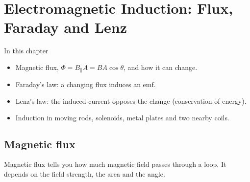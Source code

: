 \chapter{Electromagnetic Induction: Flux, Faraday and Lenz}\label{ch3:chap}
\newcommand\chThreeACW[3]{%
  \draw[line width=1.2pt, hscink] ($(#1,#2)+(110:#3)$) arc (110:400:#3);
  \draw[line width=1.2pt, hscink, -{Latex[length=2.4mm, width=2.0mm]}]
    ($(#1,#2)+(40:#3)+(310:0.05)$) -- ($(#1,#2)+(40:#3)+(130:0.19)$);}
\newcommand\chThreeCW[3]{%
  \draw[line width=1.2pt, hscink] ($(#1,#2)+(70:#3)$) arc (70:-220:#3);
  \draw[line width=1.2pt, hscink, -{Latex[length=2.4mm, width=2.0mm]}]
    ($(#1,#2)+(140:#3)+(230:0.05)$) -- ($(#1,#2)+(140:#3)+(50:0.19)$);}

\begin{summarybox}{In this chapter}
\begin{itemize}
  \item Magnetic flux, $\Phi = B_\parallel A = BA\cos\theta$, and how it can change.
  \item Faraday's law: a changing flux induces an emf.
  \item Lenz's law: the induced current opposes the change (conservation of energy).
  \item Induction in moving rods, solenoids, metal plates and two nearby coils.
\end{itemize}
\end{summarybox}

\section{Magnetic flux}\label{ch3:sec:flux}

\begin{bigidea}
Magnetic flux tells you how much magnetic field passes through a loop. It
depends on the field strength, the area and the angle.
\end{bigidea}

